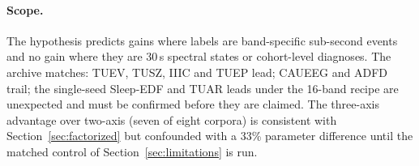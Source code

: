 \paragraph{Scope.}
The hypothesis predicts gains where labels are band-specific sub-second events and no gain where they are 30\,s spectral states or cohort-level diagnoses. The archive matches: TUEV, TUSZ, IIIC and TUEP lead; CAUEEG and ADFD trail; the single-seed Sleep-EDF and TUAR leads under the 16-band recipe are unexpected and must be confirmed before they are claimed. The three-axis advantage over two-axis (seven of eight corpora) is consistent with Section~\ref{sec:factorized} but confounded with a 33\% parameter difference until the matched control of Section~\ref{sec:limitations} is run.
